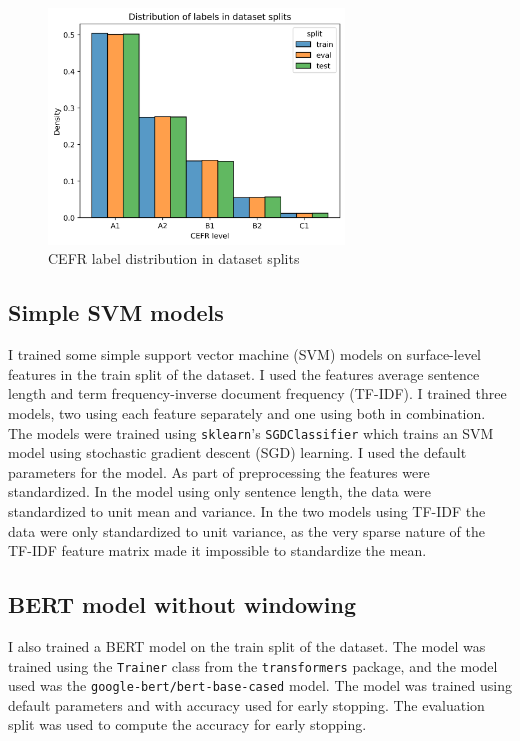 \documentclass[11pt,a4paper]{article}
\begin{document}
\begin{figure}
  \centering
  \includegraphics[width=0.7\textwidth]{figures/split-distributions-full-texts.png}
  \caption{CEFR label distribution in dataset splits}
  \label{fig:dataset-splits-labels}
\end{figure}

\subsection{Simple SVM models}

I trained some simple support vector machine (SVM) models on surface-level features in the
train split of the dataset. I used the features average sentence length and
term frequency-inverse document frequency (TF-IDF). I trained three models, two
using each feature separately and one using both in combination. The models
were trained using \verb!sklearn!'s \verb!SGDClassifier! which trains an SVM
model using stochastic gradient descent (SGD) learning. I used the default parameters for the model.
As part of preprocessing the features were standardized. In the model using only sentence
length, the data were standardized to unit mean and variance. In the two models
using TF-IDF the data were only standardized to unit variance, as the very
sparse nature of the TF-IDF feature matrix made it impossible to standardize
the mean.

\subsection{BERT model without windowing}

I also trained a BERT model on the train split of the dataset. The model was trained
using the \verb!Trainer! class from the \verb!transformers! package, and the
model used was the \verb!google-bert/bert-base-cased! model. The model was
trained using default parameters and with accuracy used for early stopping.
The evaluation split was used to compute the accuracy for early stopping.
\end{document}
